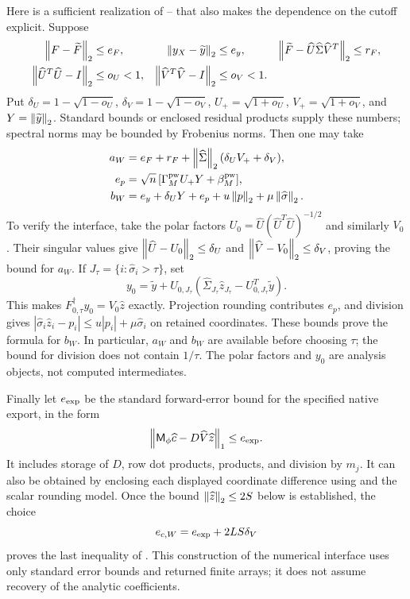 Here is a sufficient realization of --
that also makes the dependence on the cutoff explicit. Suppose
\begin{align*}
 \left\lVert F-\widetilde F\right\rVert_2&\le e_F,&
 \left\lVert y_X-\widetilde y\right\rVert_2&\le e_y,&
 \left\lVert \widetilde F-\widehat U\widehat\Sigma\widehat V^T\right\rVert_2&\le r_F,\\
 \left\lVert \widehat U^T\widehat U-I\right\rVert_2&\le o_U<1,&
 \left\lVert \widehat V^T\widehat V-I\right\rVert_2&\le o_V<1.
\end{align*}
Put $\delta_U=1-\sqrt{1-o_U}$, $\delta_V=1-\sqrt{1-o_V}$,
$U_+=\sqrt{1+o_U}$, $V_+=\sqrt{1+o_V}$, and $Y=\left\lVert \widetilde y\right\rVert_2$.
Standard bounds or enclosed residual products supply these numbers; spectral
norms may be bounded by Frobenius norms. Then one may take
\begin{align}
 a_W&=e_F+r_F+\left\lVert \widehat\Sigma\right\rVert_2(\delta_U V_++\delta_V),\nonumber\\
 e_p&=\sqrt n\,[\Gamma_M^{\rm pw}U_+Y+\beta_M^{\rm pw}],\nonumber\\
 b_W&=e_y+\delta_UY+e_p+u\left\lVert p\right\rVert_2+\mu\left\lVert \widehat\sigma\right\rVert_2.
 \label{eq:comparison-bounds}
\end{align}
To verify the interface, take the polar factors
$U_0=\widehat U(\widehat U^T\widehat U)^{-1/2}$ and similarly $V_0$.
Their singular values give
$\left\lVert \widehat U-U_0\right\rVert_2\le\delta_U$ and
$\left\lVert \widehat V-V_0\right\rVert_2\le\delta_V$, proving the bound for $a_W$.
If $J_\tau=\{i:\widehat\sigma_i>\tau\}$, set
\[
 y_0=\widetilde y+U_{0,J_\tau}
 (\widehat\Sigma_{J_\tau}\widehat z_{J_\tau}
       -U_{0,J_\tau}^T\widetilde y).
\]
This makes $F_{0,\tau}^{\dagger}y_0=V_0\widehat z$ exactly. Projection
rounding contributes $e_p$, and division gives
$|\widehat\sigma_i\widehat z_i-p_i|\le u|p_i|+\mu\widehat\sigma_i$ on
retained coordinates. These bounds prove the formula for $b_W$.
In particular, $a_W$ and $b_W$ are available before choosing $\tau$; the
bound for division does not contain $1/\tau$.
The polar factors and $y_0$ are analysis objects, not computed intermediates.

Finally let $e_{\rm exp}$ be the standard forward-error bound for the
specified native export, in the form
\[
 \left\lVert \mathsf M_\phi\widehat c-D\widehat V\widehat z\right\rVert_1\le e_{\rm exp}.
\]
It includes storage of $D$, row dot products, products, and division by $m_j$.
It can also be obtained by enclosing each displayed coordinate difference
using  and the scalar rounding model. Once the
bound $\left\lVert \widehat z\right\rVert_2\le2S$ below is established, the choice
\begin{equation}
 e_{c,W}=e_{\rm exp}+2LS\delta_V
 \label{eq:coefficient-export-bound}
\end{equation}
proves the last inequality of . This construction
of the numerical interface uses only standard error bounds and returned
finite arrays; it does not assume recovery of the analytic coefficients.

